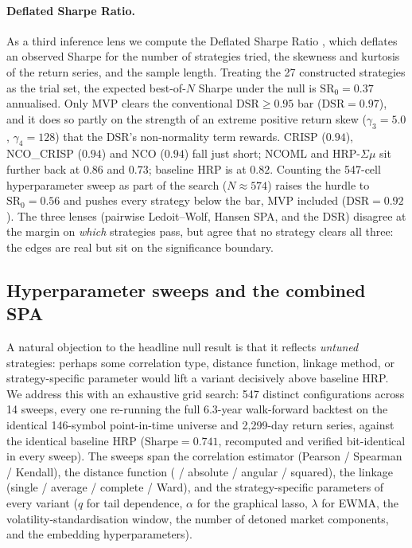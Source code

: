 \documentclass[11pt,a4paper]{article}
\begin{document}
\paragraph{Deflated Sharpe Ratio.} As a third inference lens we compute
the Deflated Sharpe Ratio \citep{bailey2014dsr}, which deflates an
observed Sharpe for the number of strategies tried, the skewness and
kurtosis of the return series, and the sample length. Treating the 27
constructed strategies as the trial set, the expected best-of-$N$
Sharpe under the null is $\mathrm{SR}_0=0.37$ annualised. Only MVP
clears the conventional $\mathrm{DSR}\ge0.95$ bar
($\mathrm{DSR}=0.97$), and it does so partly on the strength of an
extreme positive return skew ($\gamma_3=5.0$, $\gamma_4=128$) that the
DSR's non-normality term rewards. CRISP ($0.94$), NCO\_CRISP ($0.94$)
and NCO ($0.94$) fall just short; NCOML and HRP-$\Sigma\mu$ sit further
back at $0.86$ and $0.73$; baseline HRP is at $0.82$.
Counting the 547-cell hyperparameter sweep as part of the search
($N\approx574$) raises the hurdle to $\mathrm{SR}_0=0.56$ and pushes
every strategy below the bar, MVP included ($\mathrm{DSR}=0.92$). The
three lenses (pairwise Ledoit--Wolf, Hansen SPA, and the DSR)
disagree at the margin on \emph{which} strategies pass, but agree that
no strategy clears all three: the edges are real but sit on the
significance boundary.

\subsection{Hyperparameter sweeps and the combined SPA}
\label{sec:results-sweeps}

A natural objection to the headline null result is that it reflects
\emph{untuned} strategies: perhaps some correlation type, distance
function, linkage method, or strategy-specific parameter would lift a
variant decisively above baseline HRP. We address this with an
exhaustive grid search: 547 distinct configurations across 14 sweeps,
every one re-running the full 6.3-year walk-forward backtest on the
identical 146-symbol point-in-time universe and 2{,}299-day return
series, against the identical baseline HRP ($\text{Sharpe}=0.741$,
recomputed and verified bit-identical in every sweep). The sweeps span
the correlation estimator (Pearson / Spearman / Kendall), the distance
function (\citealp{lopezdeprado2016hrp} / absolute / angular / squared),
the linkage (single / average / complete / Ward), and the
strategy-specific parameters of every variant ($q$ for tail dependence,
$\alpha$ for the graphical lasso, $\lambda$ for EWMA, the
volatility-standardisation window, the number of detoned market
components, and the embedding hyperparameters).
\end{document}

